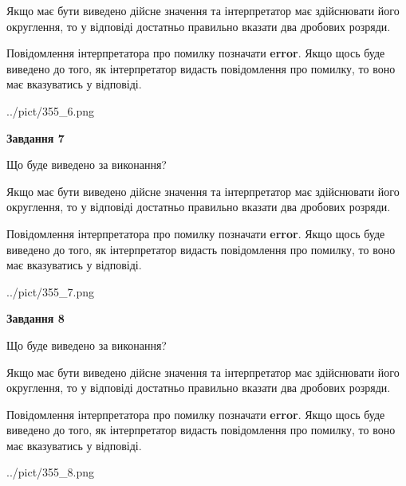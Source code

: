 \documentclass[12pt, ukrainian]{article}
\begin{document}
{\begin {Large}
Якщо має бути виведено дійсне значення та інтерпретатор має здійснювати його округлення, 
то у відповіді достатньо правильно вказати два дробових розряди.

Повідомлення інтерпретатора про помилку позначати \textbf{error}.
Якщо щось буде виведено до того, як інтерпретатор видасть повідомлення про помилку, 
то воно має вказуватись у відповіді. \par

\begin{center}
	{../pict/355_6.png}
\end{center}
\newpage

{\begin {center}\textbf{Завдання 7}\end {center}}\par
Що буде виведено за виконання? \par

Якщо має бути виведено дійсне значення та інтерпретатор має здійснювати його округлення, 
то у відповіді достатньо правильно вказати два дробових розряди.

Повідомлення інтерпретатора про помилку позначати \textbf{error}.
Якщо щось буде виведено до того, як інтерпретатор видасть повідомлення про помилку, 
то воно має вказуватись у відповіді. \par

\begin{center}
	{../pict/355_7.png}
\end{center}
\newpage

{\begin {center}\textbf{Завдання 8}\end {center}}\par
Що буде виведено за виконання? \par

Якщо має бути виведено дійсне значення та інтерпретатор має здійснювати його округлення, 
то у відповіді достатньо правильно вказати два дробових розряди.

Повідомлення інтерпретатора про помилку позначати \textbf{error}.
Якщо щось буде виведено до того, як інтерпретатор видасть повідомлення про помилку, 
то воно має вказуватись у відповіді. \par

\begin{center}
	{../pict/355_8.png}
\end{center}
\newpage


\end{Large}}
\end{document}
